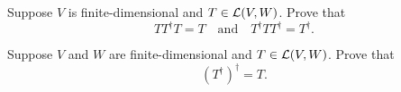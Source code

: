 \begin{exc}
\begin{exercise}
Suppose $V$ is finite-dimensional and $T\in\mathcal{L}(V,W)$. Prove that
\[ TT^\dagger T = T \quad\text{and}\quad T^\dagger TT^\dagger = T^\dagger. \]
\end{exercise}

\begin{exercise}
Suppose $V$ and $W$ are finite-dimensional and $T\in\mathcal{L}(V,W)$. Prove that
\[ (T^\dagger)^\dagger = T. \]
\end{exercise}
\end{exc}
